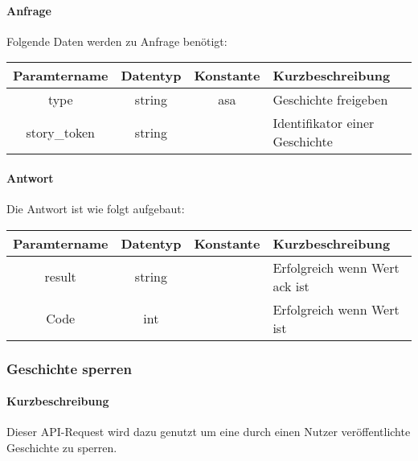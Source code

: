 \paragraph{Anfrage}Folgende Daten werden zu Anfrage benötigt:
\begin{table}[H]
	\begin{tabular}{|c|c|c|p{6.5cm}|}
		\hline
		\textbf{Paramtername} & \textbf{Datentyp} & \textbf{Konstante} & \textbf{Kurzbeschreibung}                                                                                               \\ \hline
		type                & string            & asa                & Geschichte freigeben \\ \hline
		story\_token        & string            &                    & Identifikator einer Geschichte \\ \hline
	\end{tabular}
\end{table}
\paragraph{Antwort}Die Antwort ist wie folgt aufgebaut:
\begin{table}[H]
	\begin{tabular}{|c|c|c|p{6.5cm}|}
		\hline
		\textbf{Paramtername} & \textbf{Datentyp} & \textbf{Konstante} & \textbf{Kurzbeschreibung}                                                                                               \\ \hline
		result              & string           &                 & Erfolgreich wenn Wert {\glqq ack\grqq} ist \\ \hline
		Code                & int              &                 & Erfolgreich wenn Wert {\glqq 0\grqq} ist \\ \hline
	\end{tabular}
\end{table}
\subsubsection{Geschichte sperren}
\paragraph{Kurzbeschreibung}Dieser API-Request wird dazu genutzt um eine durch einen Nutzer veröffentlichte Geschichte zu sperren.

